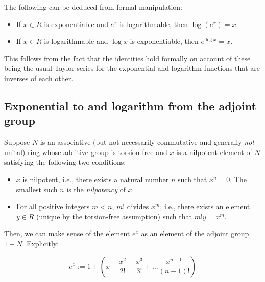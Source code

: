 \documentclass{ucetd}
\begin{document}
The following can be deduced from formal manipulation:

\begin{itemize}
\item If $x \in R$ is exponentiable and $e^x$ is logarithmable, then
  $\log(e^x) = x$.
  
\item If $x \in R$ is logarithmable and $\log x$ is exponentiable, then
  $e^{\log x} = x$.

\end{itemize}

This follows from the fact that the identities hold formally on
account of these being the usual Taylor series for the exponential and
logarithm functions that are inverses of each other.
    
\subsection{Exponential to and logarithm from the adjoint group}\label{sec:exp-and-adjoint}

Suppose $N$ is an associative (but not necessarily commutative and
generally {\em not} unital) ring whose additive group is torsion-free
and $x$ is a nilpotent element of $N$ satisfying the following two
conditions:

\begin{itemize}
\item $x$ is nilpotent, i.e., there exists a natural number $n$ such
  that $x^n = 0$. The smallest such $n$ is the {\em nilpotency} of $x$.
\item For all positive integers $m < n$, $m!$ divides $x^m$, i.e.,
  there exists an element $y \in R$ (unique by the torsion-free
  assumption) such that $m!y = x^m$.
\end{itemize}

Then, we can make sense of the element $e^x$ as an element of the
adjoint group $1 + N$. Explicitly:

$$e^x := 1 + \left(x + \frac{x^2}{2!} + \frac{x^3}{3!} + \dots \frac{x^{n-1}}{(n - 1)!}\right)$$
\end{document}
